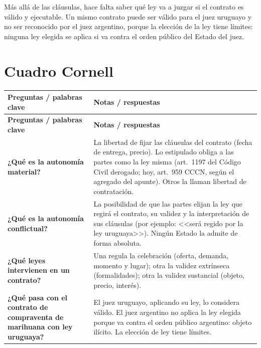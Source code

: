 \documentclass[12pt,oneside]{book}
\begin{document}
\begin{important}
M\'as all\'a de las cl\'ausulas, hace falta saber qu\'e ley va a juzgar si el contrato es v\'alido y ejecutable. Un mismo contrato puede ser v\'alido para el juez uruguayo y no ser reconocido por el juez argentino, porque la elecci\'on de la ley tiene l\'imites: ninguna ley elegida se aplica si va contra el orden p\'ublico del Estado del juez.
\end{important}

\section{Cuadro Cornell}

\begin{longtable}{
    >{\raggedright\arraybackslash}p{}
    >{\raggedright\arraybackslash}p{}
}
\toprule
\textbf{Preguntas / palabras clave} & \textbf{Notas / respuestas} \\
\midrule
\endfirsthead
\toprule
\textbf{Preguntas / palabras clave} & \textbf{Notas / respuestas} \\
\midrule
\endhead
\bottomrule
\endfoot
\bottomrule
\endlastfoot

\textbf{¿Qu\'e es la autonom\'ia material?} &
La libertad de fijar las cl\'ausulas del contrato (fecha de entrega, precio). Lo estipulado obliga a las partes como la ley misma (art.~1197 del C\'odigo Civil derogado; hoy, art.~959 CCCN, seg\'un el agregado del apunte). Otros la llaman libertad de contrataci\'on. \\
\addlinespace

\textbf{¿Qu\'e es la autonom\'ia conflictual?} &
La posibilidad de que las partes elijan la ley que regir\'a el contrato, su validez y la interpretaci\'on de sus cl\'ausulas (por ejemplo: <<ser\'a regido por la ley uruguaya>>). Ning\'un Estado la admite de forma absoluta. \\
\addlinespace

\textbf{¿Qu\'e leyes intervienen en un contrato?} &
Una regula la celebraci\'on (oferta, demanda, momento y lugar); otra la validez extr\'inseca (formalidades); otra la validez sustancial (objeto, precio, inter\'es). \\
\addlinespace

\textbf{¿Qu\'e pasa con el contrato de compraventa de marihuana con ley uruguaya?} &
El juez uruguayo, aplicando su ley, lo considera v\'alido. El juez argentino no aplica la ley elegida porque va contra el orden p\'ublico argentino: objeto il\'icito. La elecci\'on de ley tiene l\'imites. \\


\end{longtable}
\end{document}
